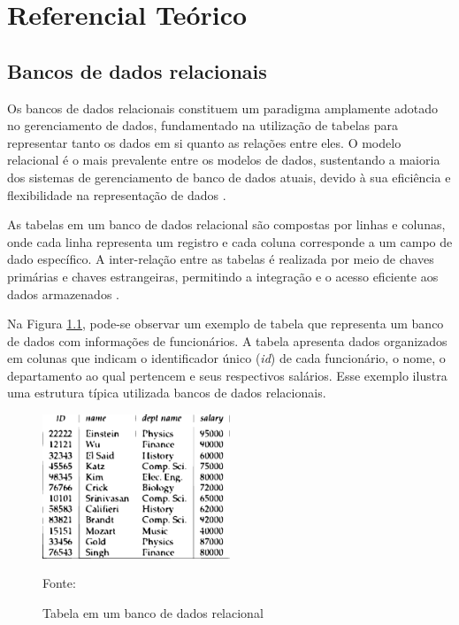 \chapter[Referencial Teórico]{Referencial Teórico}
\label{sec:referencial}

\section{Bancos de dados relacionais}

Os bancos de dados relacionais constituem um paradigma amplamente adotado no gerenciamento de dados, fundamentado na utilização de tabelas para representar tanto os dados em si quanto as relações entre eles. O modelo relacional é o mais prevalente entre os modelos de dados, sustentando a maioria dos sistemas de gerenciamento de banco de dados atuais, devido à sua eficiência e flexibilidade na representação de dados \cite{silberschatz2011database}.

As tabelas em um banco de dados relacional são compostas por linhas e colunas, onde cada linha representa um registro e cada coluna corresponde a um campo de dado específico. A inter-relação entre as tabelas é realizada por meio de chaves primárias e chaves estrangeiras, permitindo a integração e o acesso eficiente aos dados armazenados \cite{silberschatz2011database}.

Na Figura \ref{fig:exemplo}, pode-se observar um exemplo de tabela que representa um banco de dados com informações de funcionários. A tabela apresenta dados organizados em colunas que indicam o identificador único (\textit{id}) de cada funcionário, o nome, o departamento ao qual pertencem e seus respectivos salários. Esse exemplo ilustra uma estrutura típica utilizada bancos de dados relacionais.

\begin{figure}[h!]
    \centering
    \includegraphics[width=0.5\textwidth]{figuras/tabela_silbershatz.eps}
    \caption{Tabela em um banco de dados relacional}
    Fonte: \cite{silberschatz2011database}
    \label{fig:exemplo}
\end{figure}

